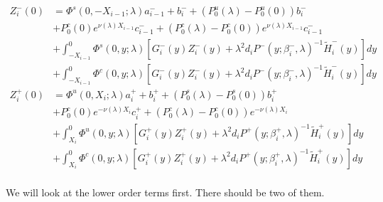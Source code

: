 \documentclass[12pt]{article}
\begin{document}
\begin{align*}
Z_i^-(0) &= \Phi^s(0, -X_{i-1}; \lambda) a_{i-1}^- + b_i^- + (P_0^u(\lambda) - P_0^u(0))b_i^- \\
&+ P_0^c(0) e^{\nu(\lambda) X_{i-1}} c_{i-1}^- + (P_0^c(\lambda) - P_0^c(0)) e^{\nu(\lambda) X_{i-1}} c_{i-1}^- \\
&+ \int_{-X_{i-1}}^0 \Phi^s(0, y; \lambda) [G_i^-(y)Z_i^-(y) + \lambda^2 d_i P^-(y; \beta_i^-, \lambda)^{-1} \tilde{H}_i^-(y)] dy \\
&+ \int_{-X_{i-1}}^0 \Phi^c(0, y; \lambda) [G_i^-(y)Z_i^-(y) + \lambda^2 d_i P^-(y; \beta_i^-, \lambda)^{-1} \tilde{H}_i^-(y)] dy  \\ 
Z_i^+(0) &= \Phi^u(0, X_i; \lambda) a_i^+ + b_i^+ + (P_0^s(\lambda) - P_0^s(0)) b_i^+ \\
&+ P_0^c(0) e^{-\nu(\lambda)X_i} c_i^+ + (P_0^c(\lambda) - P_0^c(0)) e^{-\nu(\lambda)X_i} \\
&+ \int_{X_i}^0 \Phi^u(0, y; \lambda) [G_i^+(y)Z_i^+(y) + \lambda^2 d_i P^+(y; \beta_i^+, \lambda)^{-1} \tilde{H}_i^+(y) ] dy \\
&+ \int_{X_i}^0 \Phi^c(0, y; \lambda) [G_i^+(y)Z_i^+(y) + \lambda^2 d_i P^+(y; \beta_i^+, \lambda)^{-1} \tilde{H}_i^+(y) ] dy \\
\end{align*}

We will look at the lower order terms first. There should be two of them.
\end{document}
